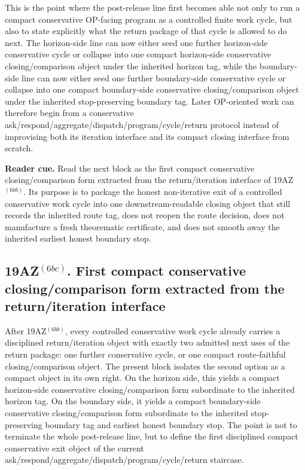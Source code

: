 \begin{remark}
\label{rem:what-the-first-conservative-cycle-to-return-iteration-interface-now-buys}
This is the point where the post-release line first becomes able not only to run a compact conservative OP-facing program as a controlled finite work cycle, but also to state explicitly what the return package of that cycle is allowed to do next. The horizon-side line can now either seed one further horizon-side conservative cycle or collapse into one compact horizon-side conservative closing/comparison object under the inherited horizon tag, while the boundary-side line can now either seed one further boundary-side conservative cycle or collapse into one compact boundary-side conservative closing/comparison object under the inherited stop-preserving boundary tag. Later OP-oriented work can therefore begin from a conservative ask/respond/aggregate/dispatch/program/cycle/return protocol instead of improvising both its iteration interface and its compact closing interface from scratch.
\end{remark}



\noindent\textbf{Reader cue.} Read the next block as the first compact conservative closing/comparison form extracted from the return/iteration interface of 19AZ$^{(6bb)}$. Its purpose is to package the honest non-iterative exit of a controlled conservative work cycle into one downstream-readable closing object that still records the inherited route tag, does not reopen the route decision, does not manufacture a fresh theorematic certificate, and does not smooth away the inherited earliest honest boundary stop.

\subsection*{19AZ$^{(6bc)}$. First compact conservative closing/comparison form extracted from the return/iteration interface}
\label{sec:first-compact-conservative-closing-comparison-form-extracted-from-the-return-iteration-interface}
After 19AZ$^{(6bb)}$, every controlled conservative work cycle already carries a disciplined return/iteration object with exactly two admitted next uses of the return package: one further conservative cycle, or one compact route-faithful closing/comparison object. The present block isolates the second option as a compact object in its own right. On the horizon side, this yields a compact horizon-side conservative closing/comparison form subordinate to the inherited horizon tag. On the boundary side, it yields a compact boundary-side conservative closing/comparison form subordinate to the inherited stop-preserving boundary tag and earliest honest boundary stop. The point is not to terminate the whole post-release line, but to define the first disciplined compact conservative exit object of the current ask/respond/aggregate/dispatch/program/cycle/return staircase.

